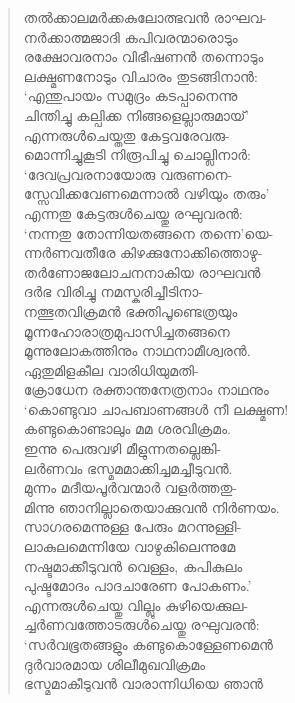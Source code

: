 \begin{verse}
തല്‍ക്കാലമര്‍ക്കകുലോത്ഭവന്‍ രാഘവ-\\
നര്‍ക്കാത്മജാദി കപിവരന്മാരൊടും\\
രക്ഷോവരനാം വിഭീഷണന്‍ തന്നൊടും\\
ലക്ഷ്മണനോടും വിചാരം തുടങ്ങിനാന്‍:\\
‘എന്തുപായം സമുദ്രം കടപ്പാനെന്നു\\
ചിന്തിച്ചു കല്പിക്ക നിങ്ങളെല്ലാരുമായ്’\\
എന്നരുള്‍ചെയ്തതു കേട്ടവരേവരു-\\
മൊന്നിച്ചുകൂടി നിരൂപിച്ചു ചൊല്ലിനാര്‍:\\
‘ദേവപ്രവരനായോരു വരുണനെ-\\
സ്സേവിക്കവേണമെന്നാല്‍ വഴിയും തരും’\\
എന്നതു കേട്ടരുള്‍ചെയ്തു രഘുവരന്‍:\\
‘നന്നതു തോന്നിയതങ്ങനെ തന്നെ’യെ-\\
ന്നര്‍ണവതീരേ കിഴക്കുനോക്കിത്തൊഴു-\\
തര്‍ണോജലോചനനാകിയ രാഘവന്‍\\
ദര്‍ഭ വിരിച്ചു നമസ്കരിച്ചീടിനാ-\\
നത്ഭുതവിക്രമന്‍ ഭക്തിപൂണ്ടെത്രയും\\
മൂന്നഹോരാത്രമുപാസിച്ചതങ്ങനെ\\
മൂന്നുലോകത്തിനും നാഥനാമീശ്വരന്‍.\\
ഏതുമിളകീല വാരിധിയുമതി-\\
ക്രോധേന രക്താന്തനേത്രനാം നാഥനും\\
‘കൊണ്ടുവാ ചാപബാണങ്ങള്‍ നീ ലക്ഷ്മണ!\\
കണ്ടുകൊണ്ടാലും മമ ശരവിക്രമം.\\
ഇന്നു പെരുവഴി മീളുന്നതല്ലെങ്കി-\\
ലര്‍ണവം ഭസ്മമമാക്കിച്ചമച്ചീടുവന്‍.\\
മുന്നം മദീയപൂര്‍വന്മാര്‍ വളര്‍ത്തതു-\\
മിന്നു ഞാനില്ലാതെയാക്കുവന്‍ നിര്‍ണയം.\\
സാഗരമെന്നുള്ള പേരും മറന്നുള്ളി-\\
ലാകുലമെന്നിയേ വാഴുകിലെന്നുമേ\\
നഷ്ടമാക്കീടുവന്‍ വെള്ളം, കപികുലം\\
പുഷ്ടമോദം പാദചാരേണ പോകണം.’\\
എന്നരുള്‍ചെയ്തു വില്ലും കുഴിയെക്കുല-\\
ച്ചര്‍ണവത്തോടരുള്‍ചെയ്തു രഘുവരന്‍:\\
‘സര്‍വഭൂതങ്ങളും കണ്ടുകൊള്ളേണമെന്‍\\
ദുര്‍വാരമായ ശിലീമുഖവിക്രമം\\
ഭസ്മമാകീടുവന്‍ വാരാന്നിധിയെ ഞാന്‍\\

\end{verse}
